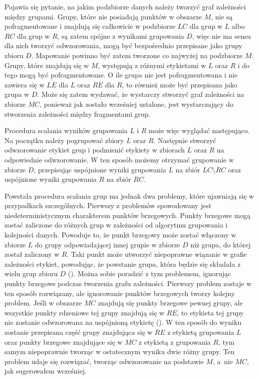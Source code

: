 Pojawia się pytanie, na jakim podzbiorze danych należy tworzyć graf zależności między grupami. Grupy, które nie posiadają punktów w obszarze $ M $, nie są pofragmentowane i znajdują się całkowicie w podzbiorze $ LC $ dla grup w $ L $ albo $ RC $ dla grup w $ R $, są zatem spójne z wynikami grupowania $ D $, więc nie ma sensu dla nich tworzyć odwzorowania, mogą być bezpośrednio przepisane jako grupy zbioru $ D $. Mapowanie powinno być zatem tworzone co najwyżej na podzbiorze $ M $. Grupy, które znajdują się w $ M $, występują z różnymi etykietami w $ L $ oraz $ R $ i do tego mogą być pofragmentowane. O ile grupa nie jest pofragmentowana i nie zawiera się w $ LE $ dla $ L $ oraz $ RE $ dla $ R $, to również może być przepisana jako grupa w $ D $. Może się zatem wydawać, że wystarczy stworzyć graf zależności na zbiorze $ MC $, ponieważ jak zostało wcześniej ustalone, jest wystarczający do stworzenia zależności między fragmentami grup.\par
Procedura scalania wyników grupowania $ L $ i $ R $ może więc wyglądać następująco. Na początku należy pogrupować zbiory $ L $ oraz $ R $. Następnie stworzyć odwzorowanie etykiet grup i podmienić etykiety w zbiorach $ L $ oraz $ R $ na odpowiednie odwzorowanie. W ten sposób możemy otrzymać grupowanie w zbiorze $ D $, przepisując uspójnione wyniki grupowania $ L $ na zbiór $ LC \setminus RC $ oraz uspójnione wyniki grupowania $ R $ na zbiór $ RC $.\par

Powstała procedura scalania grup ma jednak dwa problemy, które ujawniają się w przypadkach szczególnych. Pierwszy z problemów spowodowany jest niedeterministycznym charakterem punktów brzegowych. Punkty brzegowe mogą zostać zaliczone do różnych grup w zależności od algorytmu grupowania i kolejności danych. Powoduje to, że punkt brzegowy może zostać włączony w zbiorze $ L $ do grupy odpowiadającej innej grupie w zbiorze $ D $ niż grupa, do której został zaliczony w $ R $. Taki punkt może utworzyć niepoprawne wiązanie w grafie zależności etykiet, powodując, że powstanie grupa, która będzie się składała z wielu grup zbioru $ D $ (). Można sobie poradzić z tym problemem, ignorując punkty brzegowe podczas tworzenia grafu zależności. Pierwszy problem zostaje w ten sposób rozwiązany, ale ignorowanie punktów brzegowych tworzy kolejny problem. Jeśli w obszarze $ MC $ znajdują się punkty brzegowe pewnej grupy, ale wszystkie punkty rdzeniowe tej grupy znajdują się w $ RE $, to etykieta tej grupy nie zostanie odwzorowana na uspójnioną etykietę (). W ten sposób do wyniku zostanie przepisana część grupy znajdująca się w $ RE $ z etykietą grupowania $ L $ oraz punkty brzegowe znajdujące się w $ MC $ z etykietą z grupowania $ R $, tym samym niepoprawnie tworząc w ostatecznym wyniku dwie różny grupy. Ten problem udaje się rozwiązać, tworząc odwzorowanie na podstawie $ M $, \mbox{a nie} $ MC $, jak sugerowałem wcześniej.

